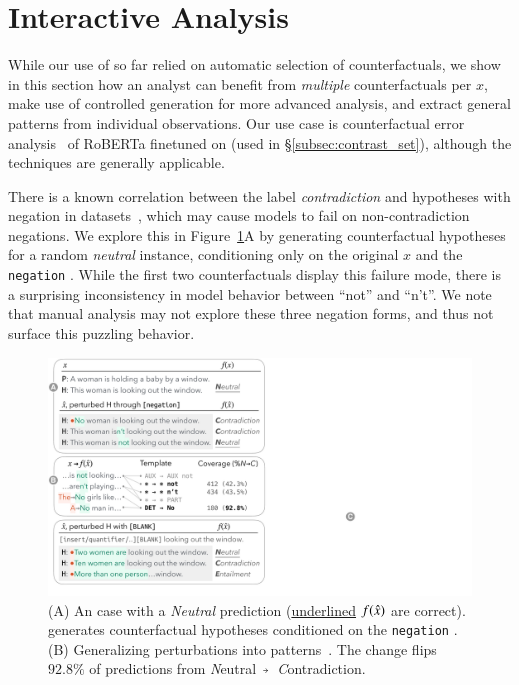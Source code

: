 

\section{Interactive Analysis}
\label{sec:app_err_analysis}

While our use of \sysname so far relied on automatic selection of counterfactuals, we show in this section how an analyst can benefit from \emph{multiple} counterfactuals per $x$, make use of controlled generation for more advanced analysis, and extract general patterns from individual observations.
Our use case is counterfactual error analysis~\cite{wu2019errudite} of RoBERTa finetuned on \nli (used in \S\ref{subsec:contrast_set}), although the techniques are generally applicable.

There is a known correlation between the label \emph{contradiction} and hypotheses with negation in \nli datasets~\cite{gururangan2018annotation}, which may cause models to fail on non-contradiction negations.
We explore this in Figure~\ref{fig:err_analysis}A by generating counterfactual hypotheses for a random \emph{neutral} instance, conditioning only on the original $x$ and the \texttt{negation} \tagstr.
While the first two counterfactuals display this failure mode, there is a surprising inconsistency in model behavior between ``not'' and ``n't''.
We note that manual analysis may not explore these three negation forms, and thus not surface this puzzling behavior.


\begin{figure}[t]
\centering
\includegraphics[trim={0 12.5cm 33cm 0cm},clip,width=1\columnwidth]{figures/err_analysis.pdf}
\vspace{-15pt}
\caption{
(A) An \nli case with a \emph{Neutral} prediction (\uline{underlined} $f(\hat{x})$ are correct).
\sysname generates counterfactual hypotheses conditioned on the \texttt{negation} \tagstr. 
(B) Generalizing perturbations into patterns~\cite{wu2020tempura}. The change  flips $92.8\%$ of predictions from \emph{N}eutral~$\veryshortarrow$~\emph{C}ontradiction.
}
\vspace{-15pt}
\label{fig:err_analysis}
\end{figure}


